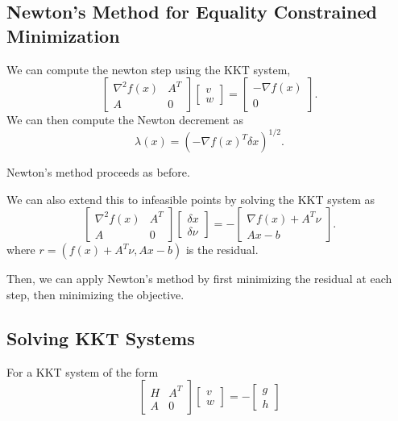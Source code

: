 \documentclass[11pt]{article}
\begin{document}
\subsection{Newton's Method for Equality Constrained Minimization}
We can compute the newton step using the KKT system, 
\[ \begin{bmatrix}
    \nabla^2 f(x) & A^T \\ A & 0
\end{bmatrix} \begin{bmatrix}
    v \\ w 
\end{bmatrix} = \begin{bmatrix}
    -\nabla f(x) \\ 0
\end{bmatrix}. \] 
We can then compute the Newton decrement as 
\[ \lambda(x) = (-\nabla f(x)^T \delta x)^{1/2}. \] 

Newton's method proceeds as before. \par 

We can also extend this to infeasible points by solving the KKT system as 
\[ \begin{bmatrix}
    \nabla^2 f(x) & A^T \\ A & 0 
\end{bmatrix} \begin{bmatrix}
    \delta x \\ \delta \nu 
\end{bmatrix} = - \begin{bmatrix}
    \nabla f(x) + A^T\nu \\ Ax - b
\end{bmatrix}. \] 
where $r = (f(x) + A^T\nu, Ax - b)$ is the residual. \par
Then, we can apply Newton's method by first minimizing the residual at each step, then minimizing the objective. \par

\subsection{Solving KKT Systems} 
For a KKT system of the form 
\[ \begin{bmatrix}
    H & A^T \\ A & 0
\end{bmatrix} \begin{bmatrix}
    v \\ w
\end{bmatrix} = - \begin{bmatrix}
    g \\ h
\end{bmatrix} \] 
\end{document}

